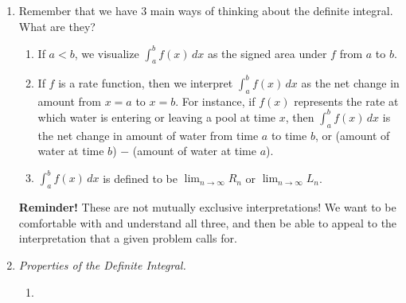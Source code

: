 \documentclass[main]{subfiles}
\begin{document}
\begin{enumerate}
\item 
  \begin{problem}[\vfill]
    Remember that we have 3 main ways of thinking about the definite
    integral.  What are they?
  \end{problem}

  \begin{solution}
    \begin{enumerate}[topsep=0pt,label=\arabic*.]
      \item If $a < b$, we visualize $\displaystyle \int_a^b f(x)\,dx$
        as the signed area under $f$ from $a$ to $b$.
      \item If $f$ is a rate function, then we interpret $\displaystyle
        \int_a^b f(x)\,dx$ as the net change in amount from $x = a$ to
        $x = b$.  For instance, if $f(x)$ represents the rate at which
        water is entering or leaving a pool at time $x$, then
        $\displaystyle \int_a^b f(x)\,dx$ is the net change in amount of
        water from time $a$ to time $b$, or (amount of water at time
        $b$) $-$ (amount of water at time $a$).
      \item $\displaystyle \int_a^b f(x)\,dx$ is defined to be
        $\displaystyle \lim_{n \to \infty} R_n$ or $\displaystyle
        \lim_{n \to \infty} L_n$.
      \end{enumerate}
  \end{solution}

  \textbf{Reminder!} These are not mutually exclusive interpretations! We want to be comfortable with and understand all three, and then be able to appeal to the interpretation that a given problem calls for. 

\item 
  \emph{Properties of the Definite Integral.}

  \begin{enumerate}[topsep=0pt]

  \item


\end{enumerate}
\end{enumerate}
\end{document}
